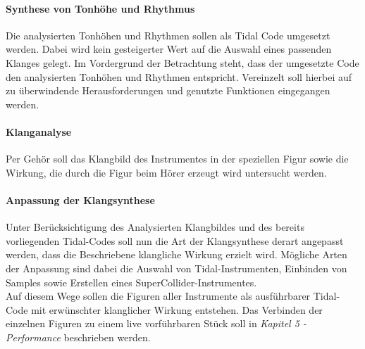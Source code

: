 \documentclass[
10pt, %
a4paper, %
oneside, %
headinclude,footinclude, %
BCOR5mm, %
]{scrartcl}
\begin{document}
\paragraph{Synthese von Tonhöhe und Rhythmus} Die analysierten Tonhöhen und Rhythmen sollen als Tidal Code umgesetzt werden. Dabei wird kein gesteigerter Wert auf die Auswahl eines passenden Klanges gelegt. Im Vordergrund der Betrachtung steht, dass der umgesetzte Code den analysierten Tonhöhen und Rhythmen entspricht. Vereinzelt soll hierbei auf zu überwindende Herausforderungen und genutzte Funktionen eingegangen werden.

\paragraph{Klanganalyse} Per Gehör soll das Klangbild des Instrumentes in der speziellen Figur sowie die Wirkung, die durch die Figur beim Hörer erzeugt wird untersucht werden. 

\paragraph{Anpassung der Klangsynthese} Unter Berücksichtigung des Analysierten Klangbildes und des bereits vorliegenden Tidal-Codes soll nun die Art der Klangsynthese derart angepasst werden, dass die Beschriebene klangliche Wirkung erzielt wird. Mögliche Arten der Anpassung sind dabei die Auswahl von Tidal-Instrumenten, Einbinden von Samples sowie Erstellen eines SuperCollider-Instrumentes.\\

\noindent Auf diesem Wege sollen die Figuren aller Instrumente als ausführbarer Tidal-Code mit erwünschter klanglicher Wirkung entstehen.
Das Verbinden der einzelnen Figuren zu einem live vorführbaren Stück soll in \textit{Kapitel 5 - Performance} beschrieben werden. 


%
%
%
\end{document}
